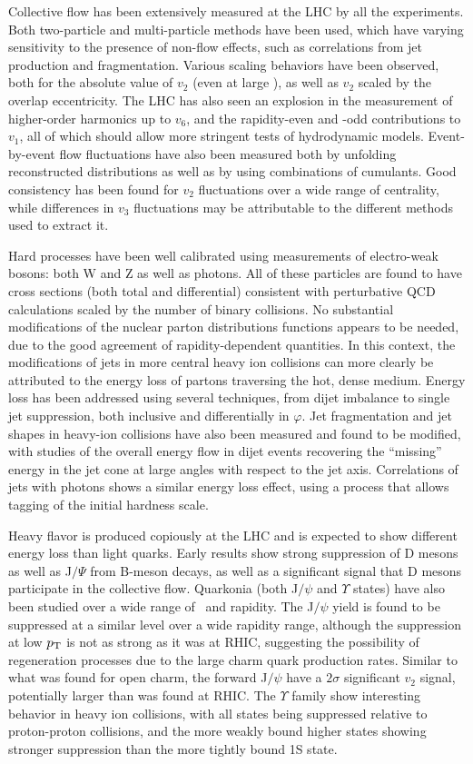 Collective flow has been extensively measured at the LHC by all the experiments.
Both two-particle and multi-particle methods have been used, which have varying sensitivity to
the presence of non-flow effects, such as correlations from jet production and fragmentation.
Various scaling behaviors have been observed, both for the absolute value of $v_2$ (even at
large \pT), as well as $v_2$ scaled by the overlap eccentricity.
The LHC has also seen an explosion in the measurement of higher-order harmonics up to $v_6$,
and the rapidity-even and -odd contributions to $v_1$, all of which should
allow more stringent tests of hydrodynamic models.
Event-by-event flow fluctuations have also been measured both by unfolding reconstructed
distributions as well as by using combinations of cumulants.  Good consistency has been found
for $v_2$ fluctuations over a wide range of centrality, while differences in $v_3$
fluctuations may be attributable to the different methods used to extract it.

Hard processes have been well calibrated using measurements of electro-weak bosons: both
W and Z as well as photons.  All of these particles are found to have cross sections
(both total and differential)
consistent with perturbative QCD calculations scaled by the number of binary collisions.
No substantial modifications of the nuclear parton distributions functions appears to be needed, due to the good
agreement of rapidity-dependent quantities.
In this context, the modifications of jets in more central heavy ion collisions can more
clearly be attributed to the energy loss of partons traversing the hot, dense medium.
Energy loss has been addressed using several techniques, from dijet imbalance
to single jet suppression, both inclusive and differentially in $\varphi$.  Jet fragmentation and
jet shapes in heavy-ion collisions have also been measured and found to be modified, with
studies of the overall energy flow in dijet events recovering the ``missing'' energy in
the jet cone at large angles with respect to the jet axis.
Correlations of jets with photons shows a similar energy loss effect, using a process that allows
tagging of the initial hardness scale.

Heavy flavor is produced copiously at the LHC and is expected to show different energy loss than
light quarks.  Early results show strong suppression of D mesons as well as J$/\Psi$ from
B-meson decays, as well as a significant signal that D mesons participate in the collective flow.
Quarkonia (both J$/\psi$ and $\Upsilon$ states) have also been studied over a wide range of \pT\
and rapidity.  The J$/\psi$ yield is found to be suppressed at a similar level over a wide
rapidity range, although the suppression at low $\mbox{$p_{\mathrm{T}}$}$ is not as strong as it was at
RHIC, suggesting the possibility of regeneration processes due to the large charm quark production
rates.  Similar to what was found for open charm, the forward J$/\psi$ have a
$2\sigma$ significant $v_2$ signal, potentially larger than was found at RHIC.
The $\Upsilon$ family show interesting behavior in heavy ion collisions, with all states being
suppressed relative to proton-proton collisions, and the more weakly bound higher states showing
stronger suppression than the more tightly bound 1S state.

